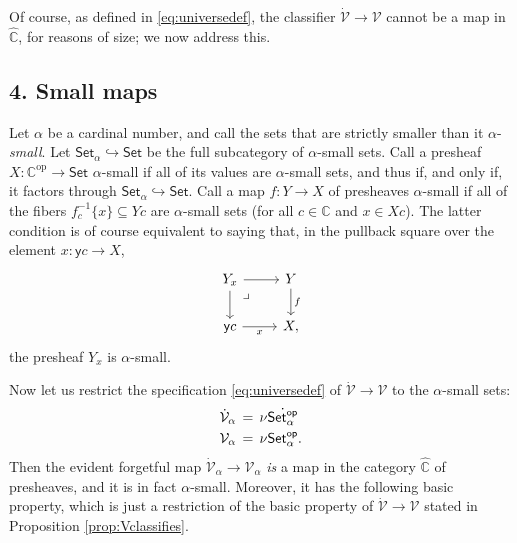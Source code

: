 \documentclass[11pt]{article}
\newcommand{\C}{\ensuremath{\mathbb{C}}}
\newcommand{\op}[1]{\ensuremath{{#1}^{\mathrm{op}}}}
\newcommand{\Set}{\ensuremath{\mathsf{Set}}}
\newcommand{\y}{\ensuremath{\mathsf{y}}} %
\newcommand{\hook}{\ensuremath{\hookrightarrow}}
\renewcommand{\to}{\ensuremath{\rightarrow}}
\newcommand{\SSet}{\ensuremath{\,\dot{\Set}}}
\newcommand{\V}{\ensuremath{\mathcal{V}}}
\newcommand{\VV}{\ensuremath{\dot{\mathcal{V}}}}
\newcommand{\pbmark}{\ar[dr, phantom, "\lrcorner" very near start, shift right=.5ex]}	%
\theoremstyle{remark}
\theoremstyle{definition}
\begin{document}
Of course, as defined in \eqref{eq:universedef}, the classifier $\VV\to\V$ cannot be a map in $\widehat{\C}$, for reasons of size; we now address this.  


\subsection*{4. Small maps}
 

Let $\alpha$ be a cardinal number, and call the sets that are strictly smaller than it $\alpha$-\emph{small}.  Let $\Set_\alpha\hook\Set$ be the full subcategory of $\alpha$-small sets.  
Call a presheaf $X : \op{\C} \to \Set$ $\alpha$-small if all of its values are $\alpha$-small sets, and thus if, and only if, it factors through $\Set_\alpha\hook\Set$. Call a map $f:Y\to X$ of presheaves $\alpha$-small if all of the fibers $f_c^{-1}\{ x\} \subseteq Yc$ are $\alpha$-small sets (for all $c\in\C$ and $x\in Xc$). The latter condition is of course equivalent to saying that, in the pullback square over the element $x:\y{c} \to X$, 
\begin{equation}\label{eq:smallmap}\textstyle
\begin{tikzcd}
	 Y_x \ar[d] \pbmark \ar[r] & Y \ar[d, "f"] \\  
	\y{c} \ar[r,swap,"x"] &  X,
 \end{tikzcd}
 \end{equation}
the presheaf $Y_x$ is $\alpha$-small.


Now let us restrict the specification \eqref{eq:universedef} of $\VV\to\V$ to the $\alpha$-small sets:
\begin{align}\label{eq:universedefalpha}\textstyle
\VV_\alpha\, &=\, \nu \dot{\Set^{\mathsf{op}}_\alpha}\\  
\V_\alpha\, &=\, \nu \Set^{\mathsf{op}}_\alpha. \notag
 \end{align}
Then the evident forgetful map $\VV_\alpha\to\V_\alpha$ \emph{is} a map in the category $\widehat{\C}$ of presheaves, and it is in fact $\alpha$-small. Moreover, it has the following basic property, which is just a restriction of the basic property of $\VV\to\V$ stated in Proposition \ref{prop:Vclassifies}.
\end{document}
